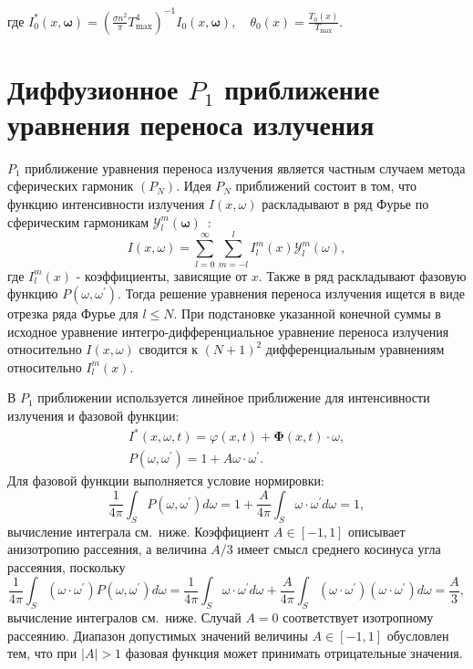 где $I_{0}^{*}(x, \boldsymbol{\omega})=\left(\frac{\sigma n^{2}}{\pi}
T_{\max }^{4}\right)^{-1} I_{0}(x, \boldsymbol{\omega}),
\quad \theta_{0}(x)=\frac{T_{0}(x)}{T_{\max }}$.


\section{Диффузионное $P_{1}$ приближение уравнения переноса излучения}\label{sec:ch1/sec2}


$P_{1}$ приближение уравнения переноса излучения является частным случаем метода
сферических гармоник $\left(P_{N}\right)$.
Идея $P_{N}$ приближений состоит в том,
что функцию интенсивности излучения $I(x, \omega)$
раскладывают в ряд Фурье по сферическим гармоникам
$\mathcal{Y}_{l}^{m}(\boldsymbol{\omega})$~\cite[496]{modest2013radiative}:
\[
    I(x, \omega)=\sum_{l=0}^{\infty} \sum_{m=-l}^{l} I_{l}^{m}(x)
    \mathcal{Y}_{l}^{m}(\omega),
\]
где $I_{l}^{m}(x)$ - коэффициенты, зависящие от $x$.
Также в ряд раскладывают фазовую функцию $P\left(\omega, \omega^{\prime}\right)$.
Тогда решение уравнения переноса излучения ищется в виде отрезка ряда Фурье для $l \leqslant N$.
При подстановке указанной конечной суммы в исходное
уравнение интегро-дифференциальное уравнение
переноса излучения относительно $I(x, \omega)$ сводится
к $(N+1)^{2}$ дифференциальным уравнениям
относительно $I_{l}^{m}(x)$.


В $P_{1}$ приближении используется линейное приближение
для интенсивности излучения и фазовой функции:
\begin{gather}
    I^{*}(x, \omega, t)=\varphi(x, t)+\boldsymbol{\Phi}(x, t) \cdot \omega, \label{eq:1_2:14}\\
    P\left(\omega, \omega^{\prime}\right)=1+A \omega \cdot \omega^{\prime}. \label{eq:1_2:15}
\end{gather}
Для фазовой функции выполняется условие нормировки:
\[
    \frac{1}{4 \pi} \int_{S} P\left(\omega, \omega^{\prime}\right) d \omega=1+\frac{A}{4 \pi}
    \int_{S} \omega \cdot \omega^{\prime} d \omega=1,
\]
вычисление интеграла см.\ ниже.
Коэффициент $A \in[-1,1]$ описывает анизотропию рассеяния,
а величина $A / 3$ имеет смысл среднего косинуса угла рассеяния, поскольку
\[
    \frac{1}{4 \pi} \int_{S}\left(\omega \cdot \omega^{\prime}\right)
    P\left(\omega, \omega^{\prime}\right) d \omega=\frac{1}{4 \pi}
    \int_{S} \omega \cdot \omega^{\prime} d \omega+\frac{A}{4 \pi}
    \int_{S}\left(\omega \cdot \omega^{\prime}\right)
    \left(\omega \cdot \omega^{\prime}\right) d \omega=\frac{A}{3},
\]
вычисление интегралов см.\ ниже.
Случай $A=0$ соответствует изотропному рассеянию.
Диапазон допустимых значений величины $A \in[-1,1]$ обусловлен тем, что при $|A|>1$
фазовая функция может принимать отрицательные значения.

